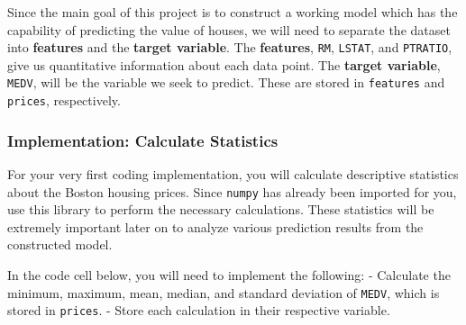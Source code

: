 \documentclass[11pt]{article}
\begin{document}
Since the main goal of this project is to construct a working model
which has the capability of predicting the value of houses, we will need
to separate the dataset into \textbf{features} and the \textbf{target
variable}. The \textbf{features},
\texttt{\textquotesingle{}RM\textquotesingle{}},
\texttt{\textquotesingle{}LSTAT\textquotesingle{}}, and
\texttt{\textquotesingle{}PTRATIO\textquotesingle{}}, give us
quantitative information about each data point. The \textbf{target
variable}, \texttt{\textquotesingle{}MEDV\textquotesingle{}}, will be
the variable we seek to predict. These are stored in \texttt{features}
and \texttt{prices}, respectively.

    \subsubsection{Implementation: Calculate
Statistics}\label{implementation-calculate-statistics}

For your very first coding implementation, you will calculate
descriptive statistics about the Boston housing prices. Since
\texttt{numpy} has already been imported for you, use this library to
perform the necessary calculations. These statistics will be extremely
important later on to analyze various prediction results from the
constructed model.

In the code cell below, you will need to implement the following: -
Calculate the minimum, maximum, mean, median, and standard deviation of
\texttt{\textquotesingle{}MEDV\textquotesingle{}}, which is stored in
\texttt{prices}. - Store each calculation in their respective variable.
\end{document}
